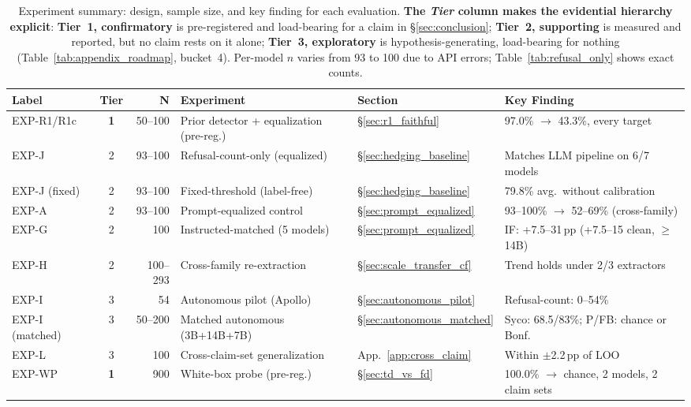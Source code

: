 \begin{table}[t]
\centering
\caption{Experiment summary: design, sample size, and key finding for each evaluation. \textbf{The \emph{Tier} column makes the evidential hierarchy explicit}: \textbf{Tier~1, confirmatory} is pre-registered and load-bearing for a claim in §\ref{sec:conclusion}; \textbf{Tier~2, supporting} is measured and reported, but no claim rests on it alone; \textbf{Tier~3, exploratory} is hypothesis-generating, load-bearing for nothing (Table~\ref{tab:appendix_roadmap}, bucket~4). Per-model $n$ varies from 93 to 100 due to API errors; Table~\ref{tab:refusal_only} shows exact counts.}
\label{tab:experiment_summary}
\begin{scriptsize}
\setlength{\tabcolsep}{2pt}
\begin{tabular}{lcrlll}
\toprule
\textbf{Label} & \textbf{Tier} & \textbf{N} & \textbf{Experiment} & \textbf{Section} & \textbf{Key Finding} \\
\midrule
EXP-R1/R1c & \textbf{1} & 50--100 & Prior detector + equalization (pre-reg.) & \S\ref{sec:r1_faithful} & 97.0\% $\to$ 43.3\%, every target \\
EXP-J & 2 & 93--100 & Refusal-count-only (equalized) & \S\ref{sec:hedging_baseline} & Matches LLM pipeline on 6/7 models \\
EXP-J (fixed) & 2 & 93--100 & Fixed-threshold (label-free) & \S\ref{sec:hedging_baseline} & 79.8\% avg.\ without calibration \\
EXP-A & 2 & 93--100 & Prompt-equalized control & \S\ref{sec:prompt_equalized} & 93--100\% $\to$ 52--69\% (cross-family) \\
EXP-G & 2 & 100 & Instructed-matched (5 models) & \S\ref{sec:prompt_equalized} & IF: +7.5--31\,pp (+7.5--15 clean, $\geq$14B) \\
EXP-H & 2 & 100--293 & Cross-family re-extraction & \S\ref{sec:scale_transfer_cf} & Trend holds under 2/3 extractors \\
EXP-I & 3 & 54 & Autonomous pilot (Apollo) & \S\ref{sec:autonomous_pilot} & Refusal-count: 0--54\% \\
EXP-I (matched) & 3 & 50--200 & Matched autonomous (3B+14B+7B) & \S\ref{sec:autonomous_matched} & Syco: 68.5/83\%; P/FB: chance or Bonf. \\
EXP-L & 3 & 100 & Cross-claim-set generalization & App.~\ref{app:cross_claim} & Within $\pm$2.2\,pp of LOO \\
EXP-WP & \textbf{1} & 900 & White-box probe (pre-reg.) & \S\ref{sec:td_vs_fd} & 100.0\% $\to$ chance, 2 models, 2 claim sets \\

\end{tabular}
\end{scriptsize}
\end{table}
